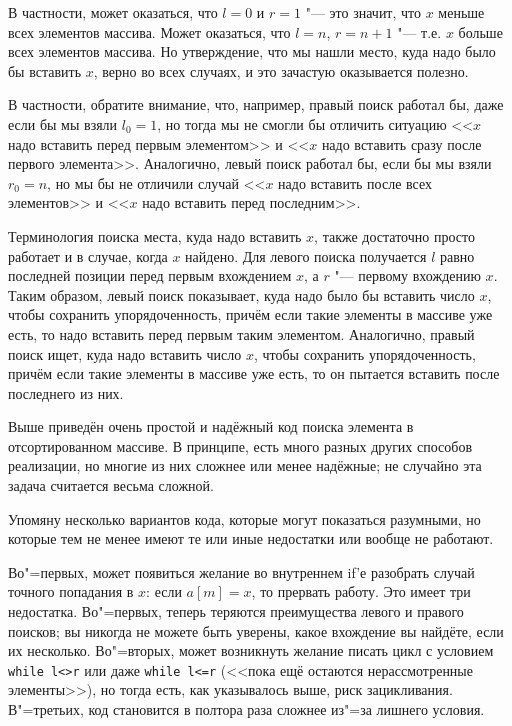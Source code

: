 \documentclass[a4paper,10pt]{problems}
\begin{document}
В частности, может оказаться, что $l=0$ и $r=1$ "--- это значит, что $x$ меньше всех элементов массива.
Может оказаться, что $l=n$, $r=n+1$ "--- т.е. $x$ больше всех элементов массива.
Но утверждение, что мы нашли место, куда надо было бы вставить $x$, верно во всех случаях, 
и это зачастую оказывается полезно.

В частности, обратите внимание, что, например, правый поиск работал бы, даже если бы мы взяли $l_0=1$, 
но тогда мы не смогли бы отличить ситуацию <<$x$ надо вставить перед первым элементом>> 
и <<$x$ надо вставить сразу после первого элемента>>.
Аналогично, левый поиск работал бы, если бы мы взяли $r_0=n$, но мы бы не отличили 
случай <<$x$ надо вставить после всех элементов>> и <<$x$ надо вставить перед последним>>.

Терминология поиска места, куда надо вставить $x$, также достаточно просто
работает и в случае, когда $x$ найдено.
Для левого поиска получается $l$ равно последней позиции перед первым вхождением $x$,
а $r$ "--- первому вхождению $x$. 
Таким образом, левый поиск показывает, куда надо было бы вставить число $x$,
чтобы сохранить упорядоченность, причём если такие элементы в массиве уже есть,
то надо вставить перед первым таким элементом.
Аналогично, правый поиск ищет, куда надо вставить число $x$, чтобы сохранить упорядоченность,
причём если такие элементы в массиве уже есть, то он пытается вставить после последнего из них.

Выше приведён очень простой и надёжный код поиска элемента в отсортированном массиве.
В принципе, есть много разных других способов реализации, но многие из них сложнее
или менее надёжные; не случайно эта задача считается весьма сложной.

Упомяну несколько вариантов кода, которые могут показаться разумными, но которые тем не менее 
имеют те или иные недостатки или вообще не работают.

Во"=первых, может появиться желание во внутреннем if'е разобрать случай точного попадания в $x$:
если $a[m]=x$, то прервать работу. Это имеет три недостатка. 
Во"=первых, теперь теряются преимущества левого и правого поисков; вы никогда не можете
быть уверены, какое вхождение вы найдёте, если их несколько.
Во"=вторых, может возникнуть желание писать цикл с условием \verb`while l<>r` или даже
\verb`while l<=r` (<<пока ещё остаются нерассмотренные элементы>>), 
но тогда есть, как указывалось выше, риск зацикливания.
В"=третьих, код становится в полтора раза сложнее из"=за лишнего условия.
\end{document}
